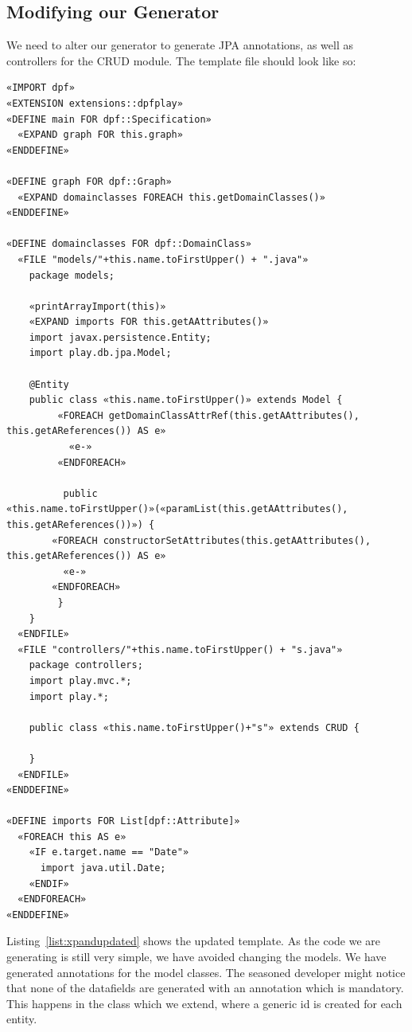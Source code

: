 \subsection{Modifying our Generator}
We need to alter our generator to generate JPA annotations, as well as controllers for the CRUD module. The template file  should look like so:
\lstset{caption=Listing shows the updated Xpand template.,label=list:xpandupdated,captionpos=b, breaklines=true}
  \begin{lstlisting}[showstringspaces=false]
«IMPORT dpf»
«EXTENSION extensions::dpfplay»
«DEFINE main FOR dpf::Specification»
  «EXPAND graph FOR this.graph»
«ENDDEFINE»

«DEFINE graph FOR dpf::Graph»
  «EXPAND domainclasses FOREACH this.getDomainClasses()»
«ENDDEFINE»

«DEFINE domainclasses FOR dpf::DomainClass»
  «FILE "models/"+this.name.toFirstUpper() + ".java"»
    package models;
    
    «printArrayImport(this)»
    «EXPAND imports FOR this.getAAttributes()»
    import javax.persistence.Entity;
    import play.db.jpa.Model;
    
    @Entity    
    public class «this.name.toFirstUpper()» extends Model {                                                                             
         «FOREACH getDomainClassAttrRef(this.getAAttributes(), this.getAReferences()) AS e»
           «e-»
         «ENDFOREACH»
                                                                                                                                                                          
          public «this.name.toFirstUpper()»(«paramList(this.getAAttributes(), this.getAReferences())») {                                             
	    «FOREACH constructorSetAttributes(this.getAAttributes(), this.getAReferences()) AS e»
	      «e-»
	    «ENDFOREACH»                                         
         }   
    }            
  «ENDFILE»
  «FILE "controllers/"+this.name.toFirstUpper() + "s.java"»
    package controllers;
    import play.mvc.*;
    import play.*;

    public class «this.name.toFirstUpper()+"s"» extends CRUD {

    }    
  «ENDFILE»
«ENDDEFINE»

«DEFINE imports FOR List[dpf::Attribute]»
  «FOREACH this AS e»
    «IF e.target.name == "Date"»
      import java.util.Date;
    «ENDIF»
  «ENDFOREACH»
«ENDDEFINE»
\end{lstlisting}
Listing~\ref{list:xpandupdated} shows the updated template. As the code we are generating is still very simple, we have avoided changing the models. We have generated  annotations for the model classes. The seasoned developer might notice that none of the datafields are generated with an  annotation which is mandatory. This happens in the  class which we extend, where a generic id is created for each entity.

